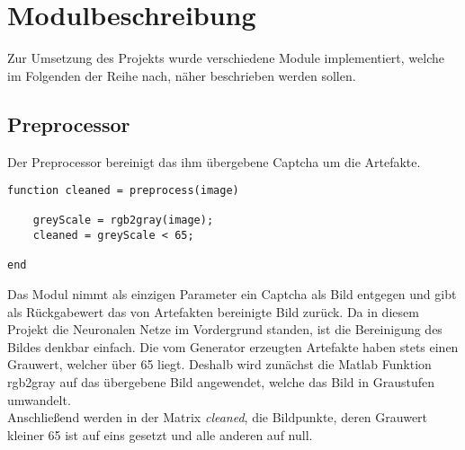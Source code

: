 \section{Modulbeschreibung}
\label{module}
Zur Umsetzung des Projekts wurde verschiedene Module implementiert, welche im Folgenden der Reihe nach, näher beschrieben werden sollen.
\subsection{Preprocessor}
Der Preprocessor bereinigt das ihm übergebene Captcha um die Artefakte.
\begin{lstlisting}
function cleaned = preprocess(image)

	greyScale = rgb2gray(image);
	cleaned = greyScale < 65;

end
\end{lstlisting}
Das Modul nimmt als einzigen Parameter ein Captcha als Bild entgegen und gibt als Rückgabewert das von Artefakten bereinigte Bild zurück. Da in diesem Projekt die Neuronalen Netze im Vordergrund standen, ist die Bereinigung des Bildes denkbar einfach. Die vom Generator erzeugten Artefakte haben stets einen Grauwert, welcher über 65 liegt. Deshalb wird zunächst die Matlab Funktion rgb2gray auf das übergebene Bild angewendet, welche das Bild in Graustufen umwandelt.\\
Anschließend werden in der Matrix \textit{cleaned}, die Bildpunkte, deren Grauwert kleiner 65 ist auf eins gesetzt und alle anderen auf null.
\newpage
